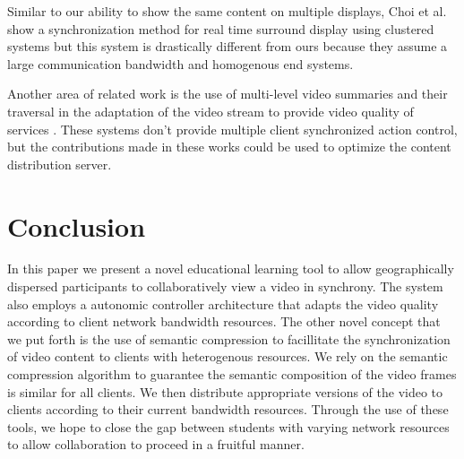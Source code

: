 \documentclass{sig-alternate}
\begin{document}
Similar to our ability to show the same content on multiple displays,
Choi et al. show a synchronization method for real time surround
display using clustered systems \cite{CHOI} but this system is
drastically different from ours because they assume a large
communication bandwidth and homogenous end systems.

Another area of related work is the use of multi-level video summaries
and their traversal in the adaptation of the video stream to provide
video quality of services
\cite{CUI,KRASIC,LEI,NEUMANN,SHIPMAN,TAN,THAKUR}.  These systems don't
provide multiple client synchronized action control, but the
contributions made in these works could be used to optimize the
content distribution server.

%

\section{Conclusion}

In this paper we present a novel educational learning tool to allow
geographically dispersed participants to collaboratively view a video
in synchrony.  The system also employs a autonomic controller
architecture that adapts the video quality according to client network
bandwidth resources.  The other novel concept that we put forth is the
use of semantic compression to facillitate the synchronization of
video content to clients with heterogenous resources.  We rely on the
semantic compression algorithm to guarantee the semantic composition
of the video frames is similar for all clients.  We then distribute
appropriate versions of the video to clients according to their
current bandwidth resources.  Through the use of these tools, we hope
to close the gap between students with varying network resources to
allow collaboration to proceed in a fruitful manner.
\end{document}
